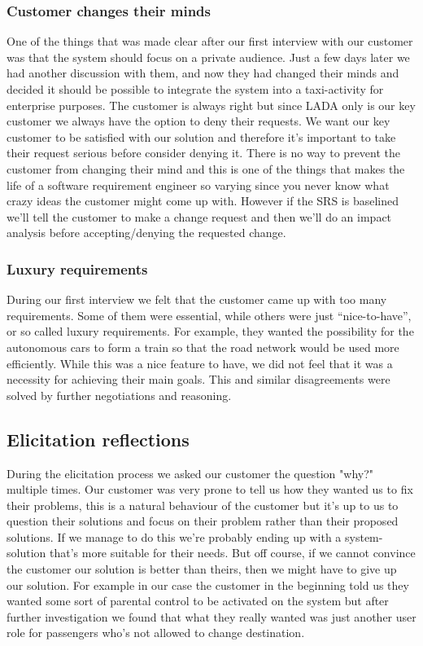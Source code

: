 \documentclass[10pt]{article}
\begin{document}
\subsubsection{Customer changes their minds}
One of the things that was made clear after our first interview with our customer was that the system should focus on a private audience. Just a few days later we had another discussion with them, and now they had changed their minds and decided it should be possible to integrate the system into a taxi-activity for enterprise purposes. The customer is always right but since LADA only is our key customer we always have the option to deny their requests. We want our key customer to be satisfied with our solution and therefore it's important to take their request serious before consider denying it. There is no way to prevent the customer from changing their mind and this is one of the things that makes the life of a software requirement engineer so varying since you never know what crazy ideas the customer might come up with. However if the SRS is baselined we'll tell the customer to make a change request and then we'll do an impact analysis before accepting/denying the requested change.

\subsubsection{Luxury requirements}
During our first interview we felt that the customer came up with too many requirements. Some of them were essential, while others were just “nice-to-have”, or so called luxury requirements. For example, they wanted the possibility for the autonomous cars to form a train so that the road network would be used more efficiently. While this was a nice feature to have, we did not feel that it was a necessity for achieving their main goals. This and similar disagreements were solved by further negotiations and reasoning. 

\subsection{Elicitation reflections}
During the elicitation process we asked our customer the question "why?" multiple times. Our customer was very prone to tell us how they wanted us to fix their problems, this is a natural behaviour of the customer but it's up to us to question their solutions and focus on their problem rather than their proposed solutions. If we manage to do this we're probably ending up with a system-solution that's more suitable for their needs. But off course, if we cannot convince the customer our solution is better than theirs, then we might have to give up our solution.
For example in our case the customer in the beginning told us they wanted some sort of parental control to be activated on the system but after further investigation we found that what they really wanted was just another user role for passengers who's not allowed to change destination.
\end{document}
